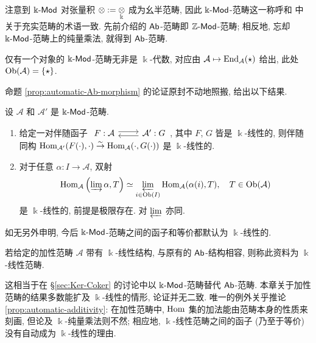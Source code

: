 注意到 $\Bbbk\text{-}\mathsf{Mod}$ 对张量积 $\otimes := \underset{\Bbbk}{\otimes}$ 成为幺半范畴, 因此 $\Bbbk\text{-}\mathsf{Mod}$-范畴这一称呼和 \cite[\S 3.4]{Li1} 中关于充实范畴的术语一致. 先前介绍的 $\mathsf{Ab}$-范畴即 $\mathbb{Z}\text{-}\mathsf{Mod}$-范畴; 相反地, 忘却 $\Bbbk\text{-}\mathsf{Mod}$-范畴上的纯量乘法, 就得到 $\mathsf{Ab}$-范畴.

\begin{example}
	仅有一个对象的 $\Bbbk\text{-}\mathsf{Mod}$-范畴无非是 $\Bbbk$-代数, 对应由 $\mathcal{A} \mapsto \operatorname{End}_{\mathcal{A}}(\star)$ 给出, 此处 $\operatorname{Ob}(\mathcal{A}) = \{\star\}$.
\end{example}

命题 \ref{prop:automatic-Ab-morphism} 的论证原封不动地照搬, 给出以下结果.

\begin{proposition}\label{prop:automatic-k-morphism}
	设 $\mathcal{A}$ 和 $\mathcal{A}'$ 是 $\Bbbk\text{-}\mathsf{Mod}$-范畴.
	\begin{enumerate}
		\item 给定一对伴随函子
		$\begin{tikzcd}
			F: \mathcal{A} \arrow[shift left, r] & \mathcal{A}' \arrow[shift left, l] : G
		\end{tikzcd}$,
		其中 $F$, $G$ 皆是 $\Bbbk$-线性的, 则伴随同构 $\operatorname{Hom}_{\mathcal{A}'}(F(\cdot), \cdot) \stackrel{\sim}{\rightarrow} \operatorname{Hom}_{\mathcal{A}}(\cdot, G(\cdot))$ 是 $\Bbbk$-线性的.
		\item 对于任意 $\alpha: I \to \mathcal{A}$, 双射
		\[ \operatorname{Hom}_{\mathcal{A}}\left( \varinjlim \alpha, T \right) \simeq \varprojlim_{i \in \operatorname{Ob}(I)} \operatorname{Hom}_{\mathcal{A}}(\alpha(i), T), \quad T \in \operatorname{Ob}(\mathcal{A}) \]
		是 $\Bbbk$-线性的, 前提是极限存在. 对 $\varprojlim$ 亦同.
	\end{enumerate}
\end{proposition}

如无另外申明, 今后 $\Bbbk\text{-}\mathsf{Mod}$-范畴之间的函子和等价都默认为 $\Bbbk$-线性的.

\begin{definition}\label{def:k-linear-cat}
	若给定的加性范畴 $\mathcal{A}$ 带有 $\Bbbk$-线性结构, 与原有的 $\mathsf{Ab}$-结构相容, 则称此资料为 $\Bbbk$-线性范畴.
\end{definition}

这相当于在 \S\ref{sec:Ker-Coker} 的讨论中以 $\Bbbk\text{-}\mathsf{Mod}$-范畴替代 $\mathsf{Ab}$-范畴. 本章关于加性范畴的结果多数能扩及 $\Bbbk$-线性的情形, 论证并无二致. 唯一的例外关乎推论 \ref{prop:automatic-additivity}: 在加性范畴中, $\operatorname{Hom}$ 集的加法能由范畴本身的性质来刻画, 但论及 $\Bbbk$-纯量乘法则不然; 相应地, $\Bbbk$-线性范畴之间的函子 (乃至于等价) 没有自动成为 $\Bbbk$-线性的理由.

